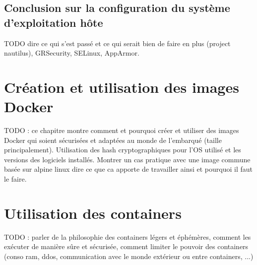\documentclass[11pt,a4paper,oneside]{report}
\begin{document}
\section{Conclusion sur la configuration du système d'exploitation hôte}
TODO dire ce qui s'est passé et ce qui serait bien de faire en plus (project nautilus), GRSecurity, SELinux, AppArmor.


\chapter{Création et utilisation des images Docker}\label{creation_utilisation_images_docker}
TODO : ce chapitre montre comment et pourquoi créer et utiliser des images Docker qui soient sécurisées et adaptées au monde de l'embarqué (taille principalement). Utilisation des hash cryptographiques pour l'OS utilisé et les versions des logiciels installés.
Montrer un cas pratique avec une image commune basée sur alpine linux dire ce que ca apporte de travailler ainsi et pourquoi il faut le faire.


\chapter{Utilisation des containers}\label{utilisation_containers}
TODO : parler de la philosophie des containers légers et éphémères, comment les exécuter de manière sûre et sécurisée, comment limiter le pouvoir des containers (conso ram, ddos, communication avec le monde extérieur ou entre containers, ...)
\end{document}
